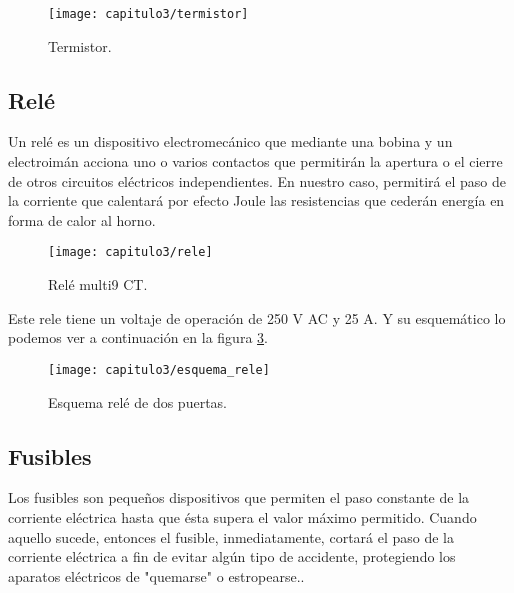 \hfill
\begin{figure}[H]%
\noindent \begin{centering}
\texttt{[image: capitulo3/termistor]}
\par\end{centering}
\smallskip
\caption{\label{fig:termistor} Termistor.}
\end{figure}
	
 


\subsection{Relé}
Un relé es un dispositivo electromecánico que mediante una bobina y un electroimán acciona uno o varios contactos que permitirán la apertura o el cierre de otros circuitos eléctricos independientes. En nuestro caso, permitirá el paso de la corriente que calentará por efecto Joule las resistencias que cederán energía en forma de calor al horno.

\smallskip	
\begin{figure}[H]%
\noindent \begin{centering}
\texttt{[image: capitulo3/rele]}
\par\end{centering}
\smallskip
\caption{\label{fig:rele} Relé multi9 CT.}
\end{figure}

Este rele tiene un voltaje de operación de 250 V AC y 25 A. Y su esquemático lo podemos ver a continuación en la figura \ref{fig:esquema_rele}\cite{multi9}.

\smallskip	
\begin{figure}[H]%
\noindent \begin{centering}
\texttt{[image: capitulo3/esquema\_rele]}
\par\end{centering}
\smallskip
\caption{\label{fig:esquema_rele}Esquema relé de dos puertas.}
\end{figure}

\subsection{Fusibles}
Los fusibles son pequeños dispositivos que permiten el paso constante de la corriente eléctrica hasta que ésta supera el valor máximo permitido. Cuando aquello sucede, entonces el fusible, inmediatamente, cortará el paso de la corriente eléctrica a fin de evitar algún tipo de accidente, protegiendo los aparatos eléctricos de "quemarse" o estropearse..

